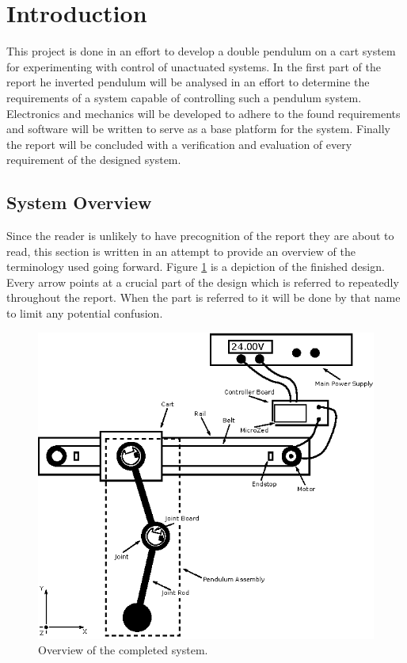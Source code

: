 \section{Introduction}
This project is done in an effort to develop a double pendulum on a cart system for experimenting with control of unactuated systems.
In the first part of the report he inverted pendulum will be analysed in an effort to determine the requirements of a system capable of controlling such a pendulum system.
Electronics and mechanics will be developed to adhere to the found requirements and software will be written to serve as a base platform for the system.
Finally the report will be concluded with a verification and evaluation of every requirement of the designed system.



\subsection{System Overview} %
\label{sub:system_overview}
Since the reader is unlikely to have precognition of the report they are about to read, this section is written in an attempt to provide an overview of the terminology used going forward.
Figure \ref{fig:systemoverview} is a depiction of the finished design.
Every arrow points at a crucial part of the design which is referred to repeatedly throughout the report.
When the part is referred to it will be done by that name to limit any potential confusion.
\begin{figure}[h]
	\centering
	\includegraphics[width=\linewidth]{graphics/system_overview}
	\caption{Overview of the completed system.}
	\label{fig:systemoverview}
\end{figure}

